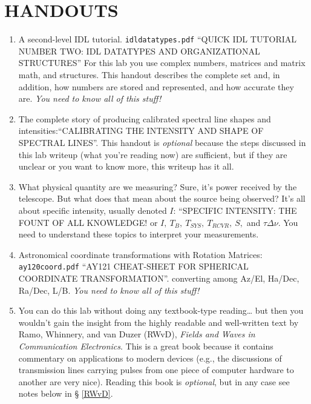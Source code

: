 \documentclass[12pt,preprint]{aastex}
\begin{document}
\section{HANDOUTS} \label{handouts}
\begin{enumerate}
\item A second-level IDL tutorial. {\tt idldatatypes.pdf} ``QUICK IDL %
  TUTORIAL NUMBER TWO: IDL DATATYPES AND ORGANIZATIONAL STRUCTURES'' For
  this lab you use complex numbers, matrices and matrix
  math, and structures. This handout describes the complete set and, in
  addition, how numbers are stored and represented, and how accurate
  they are. {\it You need to know all of this stuff!}

\item The complete story of producing calibrated spectral line shapes
  and intensities:``CALIBRATING THE INTENSITY AND SHAPE OF SPECTRAL
  LINES''. This handout is {\it optional} because the steps discussed in
  this lab writeup (what you're reading now) are sufficient, but
  if they are unclear or you want to know more, this writeup has it all.

\item What physical quantity are we measuring? Sure, it's power received
  by the telescope. But what does that mean about the source being
  observed? It's all about specific intensity, usually denoted $I$:
  ``SPECIFIC INTENSITY: THE FOUNT OF ALL KNOWLEDGE! or $I,
    \ T_B, \ T_{SYS}, \ T_{RCVR}, \ S,$ and $\tau \Delta \nu$. You need
  to understand these topics to interpret your measurements.

\item Astronomical coordinate transformations with Rotation Matrices:
  {\tt ay120coord.pdf} ``AY121 CHEAT-SHEET FOR SPHERICAL COORDINATE %
  TRANSFORMATION''. converting among Az/El, Ha/Dec, Ra/Dec, L/B. {\it
    You need to know all of this stuff!}

\item You can do this lab without doing any textbook-type reading\dots
  but then you wouldn't gain the insight from the highly readable and
  well-written text by Ramo, Whinnery, and van Duzer (RWvD), {\it Fields
    and Waves in Communication Electronics}. This is a great book
  because it contains commentary on applications to modern devices
  (e.g., the discussions of transmission lines carrying pulses from one
  piece of computer hardware to another are very nice).  Reading this
  book is {\it optional}, but in any case see notes below in \S
  \ref{RWvD}.

\end{enumerate}
\end{document}
